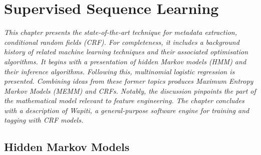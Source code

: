 
\chapter{Supervised Sequence Learning} %

\label{Chapter2} %


\emph{This chapter presents the state-of-the-art technique for metadata extraction, conditional random fields (CRF). For completeness, it includes a background history of related machine learning techniques and their associated optimisation algorithms. It begins with a presentation of hidden Markov models (HMM) and their inference algorithms. Following this, multinomial logistic regression is presented. Combining ideas from these former topics produces Maximum Entropy Markov Models (MEMM) and CRFs. Notably, the discussion pinpoints the part of the mathematical model relevant to feature engineering. The chapter concludes with a description of Wapiti, a general-purpose software engine for training and tagging with CRF models.}

\section{Hidden Markov Models}

